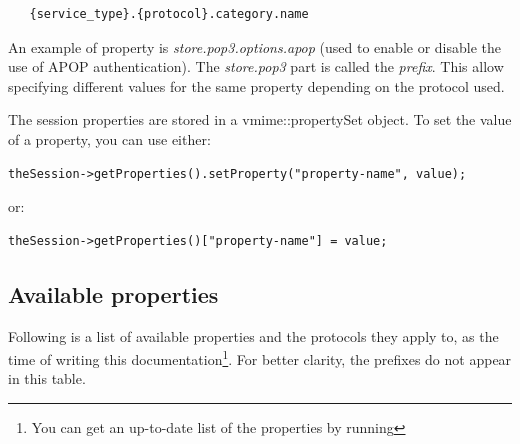 \begin{verbatim}
   {service_type}.{protocol}.category.name
\end{verbatim}

An example of property is \emph{store.pop3.options.apop} (used to enable or
disable the use of APOP authentication). The \emph{store.pop3} part is called
the \emph{prefix}. This allow specifying different values for the same
property depending on the protocol used.

The session properties are stored in a {\vcode vmime::propertySet} object.
To set the value of a property, you can use either:

\begin{lstlisting}
theSession->getProperties().setProperty("property-name", value);
\end{lstlisting}

or:

\begin{lstlisting}
theSession->getProperties()["property-name"] = value;
\end{lstlisting}


\subsection{Available properties} %

Following is a list of available properties and the protocols they apply to,
as the time of writing this documentation\footnote{You can get an up-to-date
list of the properties by running }. For better clarity,
the prefixes do not appear in this table.

